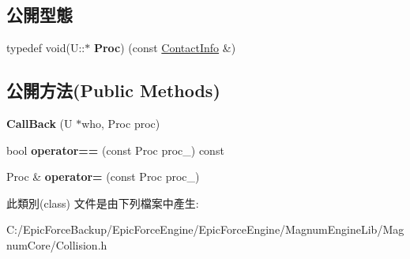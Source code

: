 \subsection*{公開型態}
\begin{DoxyCompactItemize}
\item 
typedef void(U\+::$\ast$ {\bfseries Proc}) (const \hyperlink{class_magnum_1_1_collision_1_1_contact_info}{Contact\+Info} \&)\hypertarget{class_magnum_1_1_collision_1_1_call_back_a633083a5d62e929e9c0af58923b91e41}{}\label{class_magnum_1_1_collision_1_1_call_back_a633083a5d62e929e9c0af58923b91e41}

\end{DoxyCompactItemize}
\subsection*{公開方法(Public Methods)}
\begin{DoxyCompactItemize}
\item 
{\bfseries Call\+Back} (U $\ast$who, Proc proc)\hypertarget{class_magnum_1_1_collision_1_1_call_back_a4fcae438e71317530286861b5c1666fc}{}\label{class_magnum_1_1_collision_1_1_call_back_a4fcae438e71317530286861b5c1666fc}

\item 
bool {\bfseries operator==} (const Proc proc\+\_\+) const \hypertarget{class_magnum_1_1_collision_1_1_call_back_ac44d5b54345f8943688ce0662a0655d2}{}\label{class_magnum_1_1_collision_1_1_call_back_ac44d5b54345f8943688ce0662a0655d2}

\item 
Proc \& {\bfseries operator=} (const Proc proc\+\_\+)\hypertarget{class_magnum_1_1_collision_1_1_call_back_a357d7b032d3d7910c4a813a7fe2f0293}{}\label{class_magnum_1_1_collision_1_1_call_back_a357d7b032d3d7910c4a813a7fe2f0293}

\end{DoxyCompactItemize}


此類別(class) 文件是由下列檔案中產生\+:\begin{DoxyCompactItemize}
\item 
C\+:/\+Epic\+Force\+Backup/\+Epic\+Force\+Engine/\+Epic\+Force\+Engine/\+Magnum\+Engine\+Lib/\+Magnum\+Core/Collision.\+h\end{DoxyCompactItemize}
